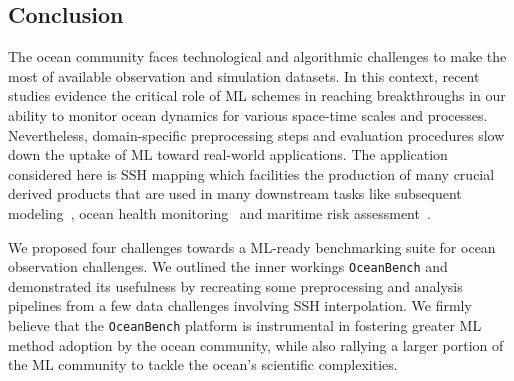 \subsection*{Conclusion}
The ocean community faces technological and algorithmic challenges to make the most of available observation and simulation datasets. 
In this context, recent studies evidence the critical role of ML schemes in reaching breakthroughs in our ability to monitor ocean dynamics for various space-time scales and processes. 
Nevertheless, domain-specific preprocessing steps and evaluation procedures slow down the uptake of ML toward real-world applications. 
The application considered here is SSH mapping which facilities the production of many crucial derived products that are used in many downstream tasks like subsequent modeling~\citep{ML4OCN}, ocean health monitoring~\citep{ML4NATURECONSERVATION,OCNHEALTH,OCEANHEALTH2} and maritime risk assessment~\citep{SSHOPERATIONAL}.

We proposed four challenges towards a ML-ready benchmarking suite for ocean observation challenges. 
We outlined the inner workings \texttt{OceanBench} and demonstrated its usefulness by recreating some preprocessing and analysis pipelines from a few data challenges involving SSH interpolation.
We firmly believe that the \texttt{OceanBench} platform is instrumental in fostering greater ML method adoption by the ocean community, while also rallying a larger portion of the ML community to tackle the ocean's scientific complexities.


